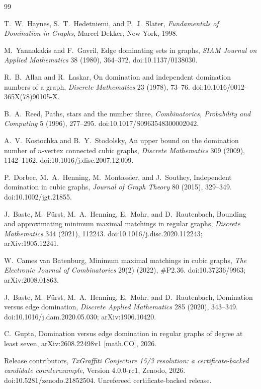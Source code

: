 \documentclass[11pt]{article}
\theoremstyle{definition}
\theoremstyle{remark}
\begin{document}
\begin{thebibliography}{99}

T.~W.~Haynes, S.~T.~Hedetniemi, and P.~J.~Slater,
\newblock \emph{Fundamentals of Domination in Graphs},
\newblock Marcel Dekker, New York, 1998.

M.~Yannakakis and F.~Gavril,
\newblock Edge dominating sets in graphs,
\newblock \emph{SIAM Journal on Applied Mathematics} 38 (1980), 364--372.
\newblock doi:10.1137/0138030.

R.~B.~Allan and R.~Laskar,
\newblock On domination and independent domination numbers of a graph,
\newblock \emph{Discrete Mathematics} 23 (1978), 73--76.
\newblock doi:10.1016/0012-365X(78)90105-X.

B.~A.~Reed,
\newblock Paths, stars and the number three,
\newblock \emph{Combinatorics, Probability and Computing} 5 (1996), 277--295.
\newblock doi:10.1017/S0963548300002042.

A.~V.~Kostochka and B.~Y.~Stodolsky,
\newblock An upper bound on the domination number of $n$-vertex connected cubic graphs,
\newblock \emph{Discrete Mathematics} 309 (2009), 1142--1162.
\newblock doi:10.1016/j.disc.2007.12.009.

P.~Dorbec, M.~A.~Henning, M.~Montassier, and J.~Southey,
\newblock Independent domination in cubic graphs,
\newblock \emph{Journal of Graph Theory} 80 (2015), 329--349.
\newblock doi:10.1002/jgt.21855.

J.~Baste, M.~F\"urst, M.~A.~Henning, E.~Mohr, and D.~Rautenbach,
\newblock Bounding and approximating minimum maximal matchings in regular graphs,
\newblock \emph{Discrete Mathematics} 344 (2021), 112243.
\newblock doi:10.1016/j.disc.2020.112243; arXiv:1905.12241.

W.~Cames van Batenburg,
\newblock Minimum maximal matchings in cubic graphs,
\newblock \emph{The Electronic Journal of Combinatorics} 29(2) (2022), \#P2.36.
\newblock doi:10.37236/9963; arXiv:2008.01863.

J.~Baste, M.~F\"urst, M.~A.~Henning, E.~Mohr, and D.~Rautenbach,
\newblock Domination versus edge domination,
\newblock \emph{Discrete Applied Mathematics} 285 (2020), 343--349.
\newblock doi:10.1016/j.dam.2020.05.030; arXiv:1906.10420.

C.~Gupta,
\newblock Domination versus edge domination in regular graphs of degree at least seven,
\newblock arXiv:2608.22498v1 [math.CO], 2026.

Release contributors,
\newblock \emph{TxGraffiti Conjecture 15/3 resolution: a certificate-backed candidate counterexample},
\newblock Version 4.0.0-rc1, Zenodo, 2026.
\newblock doi:10.5281/zenodo.21852504. Unrefereed certificate-backed release.

\end{thebibliography}
\end{document}

